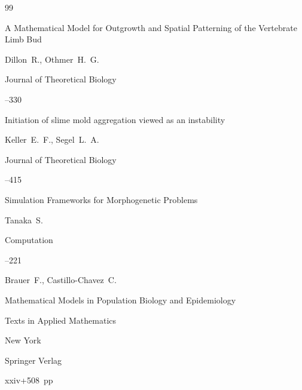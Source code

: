 \begin{thebibliography}{99}
 


\paper A Mathematical Model for Outgrowth and Spatial Patterning of the Vertebrate Limb Bud

\by   Dillon~R., Othmer~H.~G.

\jour   Journal of Theoretical Biology




--330


 


\paper  Initiation of slime mold aggregation viewed as an instability

\by    Keller~E.~F., Segel~L.~A.

\jour   Journal of Theoretical Biology




--415


 


\paper  Simulation Frameworks for Morphogenetic Problems

\by    Tanaka~S.

\jour   Computation




--221 


 


\by    Brauer~F., Castillo-Chavez~C. 

\book Mathematical Models in Population Biology and Epidemio\-logy

\serial Texts in Applied Mathematics


\publaddr New York

\publ Springer Verlag


\totalpages xxiv+508~pp \nofrills


\end{thebibliography}
